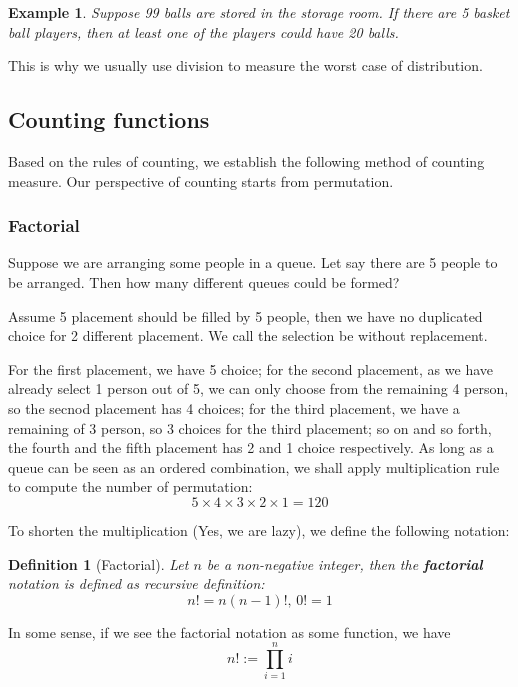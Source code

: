 \documentclass[12pt]{article}
\newtheorem{definition}{Definition}[section]
\newtheorem*{example}{Example}
\begin{document}
    \begin{example}
        Suppose 99 balls are stored in the storage room. If there are 5 basket ball players, then at least one of the players could have 20 balls.
    \end{example}

    This is why we usually use division to measure the worst case of distribution.

    \subsection{Counting functions}

    Based on the rules of counting, we establish the following method of counting measure. Our perspective of counting starts from permutation.

    \subsubsection*{Factorial}

    Suppose we are arranging some people in a queue. Let say there are 5 people to be arranged. Then how many different queues could be formed?

    Assume 5 placement should be filled by 5 people, then we have no duplicated choice for 2 different placement. We call the selection be without replacement.

    For the first placement, we have 5 choice; for the second placement, as we have already select 1 person out of 5, we can only choose from the remaining 4 person, so the secnod placement has 4 choices; for the third placement, we have a remaining of 3 person, so 3 choices for the third placement; so on and so forth, the fourth and the fifth placement has 2 and 1 choice respectively. As long as a queue can be seen as an ordered combination, we shall apply multiplication rule to compute the number of permutation: $$5\times 4\times 3\times 2\times 1 = 120$$

    To shorten the multiplication (Yes, we are lazy), we define the following notation:

    \begin{definition}[Factorial]
        Let $n$ be a non-negative integer, then the \textbf{factorial} notation is defined as recursive definition: $$n!=n(n-1)!, \, 0!=1$$
    \end{definition}

    In some sense, if we see the factorial notation as some function, we have $$n!:=\prod_{i=1}^n i$$
\end{document}
